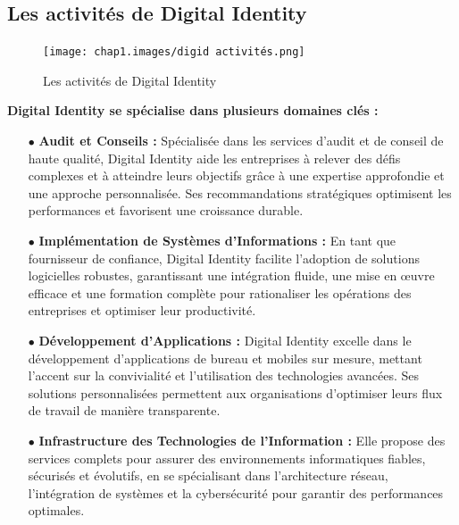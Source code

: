 \subsection{ Les activités de Digital Identity  }
\begin{figure}[ht]
    \centering
    \texttt{[image: chap1.images/digid activités.png]}
    \caption{Les activités de Digital Identity}
\end{figure}
\newpage
\textbf{Digital Identity se spécialise dans plusieurs domaines clés :}\\
\begin{itemize}

    \item[$\bullet$] \textbf {Audit et Conseils :} Spécialisée dans les services d'audit et de conseil de haute qualité, Digital Identity aide les entreprises à relever des défis complexes et à atteindre leurs objectifs grâce à une expertise approfondie et une approche personnalisée. Ses recommandations stratégiques optimisent les performances et favorisent une croissance durable.\\

    \item[$\bullet$] \textbf {Implémentation de Systèmes d'Informations :} En tant que fournisseur de confiance, Digital Identity facilite l'adoption de solutions logicielles robustes, garantissant une intégration fluide, une mise en œuvre efficace et une formation complète pour rationaliser les opérations des entreprises et optimiser leur productivité.\\

    \item[$\bullet$] \textbf {Développement d'Applications :} Digital Identity excelle dans le développement d'applications de bureau et mobiles sur mesure, mettant l'accent sur la convivialité et l'utilisation des technologies avancées. Ses solutions personnalisées permettent aux organisations d'optimiser leurs flux de travail de manière transparente.\\

    \item[$\bullet$] \textbf {Infrastructure des Technologies de l'Information :} Elle propose des services complets pour assurer des environnements informatiques fiables, sécurisés et évolutifs, en se spécialisant dans l'architecture réseau, l'intégration de systèmes et la cybersécurité pour garantir des performances optimales.\\

\end{itemize}


